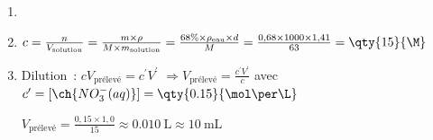 \begin{enumerate}
    \item {}
    \item $c=\frac{n}{V_{\text{solution}}}=
          \frac{m\times\rho}{M\times m_{\text{solution}}}=
          \frac{68\% \times \rho_{\text{eau}}\times d}{M}=
          \frac{0,68\times 1000\times 1,41}{63}=\qty{15}{\M}$
    \item Dilution~: $cV_{\text{prélevé}}=c^{\prime}V^{\prime}$ \quad
          $\Rightarrow V_{\text{prélevé}}=\frac{c^{\prime}V^{\prime}}{c}$ \quad
          avec \ $c^{\prime}=[\ch{NO_{3}^{-}(aq)}]=\qty{0.15}{\mol\per\L}$

          $V_{\text{prélevé}}=\frac{0,15\times 1,0}{15}\approx
          \qty{0,010}{\liter}\approx\qty{10}{\milli\liter}$
\end{enumerate}

